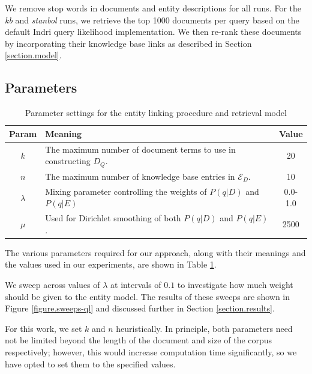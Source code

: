 \documentclass{sig-alternate}
\begin{document}
We remove stop words in documents and entity descriptions for all runs. For the \textit{kb} and \textit{stanbol} runs, we retrieve the top 1000 documents per query based on the default Indri query likelihood implementation. We then re-rank these documents by incorporating their knowledge base links as described in Section \ref{section.model}.

\subsection{Parameters}\label{section.evaluation.parameters}

\begin{table}[htbp]
\centering
\begin{tabular}{|c|p{}|c|} \hline
{\bf Param} & {\bf Meaning} & {\bf Value} \\ \hline
$k$ & The maximum number of document terms to use in constructing $D_Q$. & 20 \\ \hline
$n$ & The maximum number of knowledge base entries in $\mathcal{E}_D$. & 10 \\ \hline
$\lambda$ & Mixing parameter controlling the weights of $P(q|D)$ and $P(q|E)$ & 0.0-1.0 \\ \hline
$\mu$ & Used for Dirichlet smoothing of both $P(q|D)$ and $P(q|E)$. & 2500 \\ \hline
\end{tabular}
\caption{Parameter settings for the entity linking procedure and retrieval model}
\label{table.parameters}
\end{table}

The various parameters required for our approach, along with their meanings and the values used in our experiments, are shown in Table \ref{table.parameters}. 

We sweep across values of $\lambda$ at intervals of $0.1$ to investigate how much weight should be given to the entity model. The results of these sweeps are shown in Figure \ref{figure.sweeps-ql} and discussed further in Section \ref{section.results}.

For this work, we set $k$ and $n$ heuristically. In principle, both parameters need not be limited beyond the length of the document and size of the corpus respectively; however, this would increase computation time significantly, so we have opted to set them to the specified values.
\end{document}
